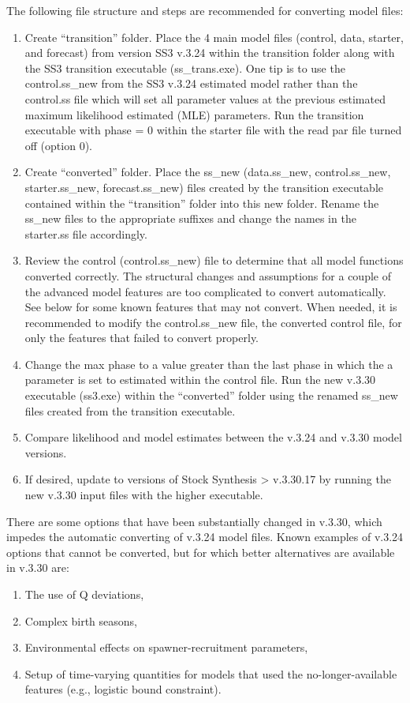 The following file structure and steps are recommended for converting model files:
\begin{enumerate}
	\item Create ``transition'' folder.  Place the 4 main model files (control, data, starter, and forecast) from version SS3 v.3.24 within the transition folder along with the SS3 transition executable (ss\_trans.exe).  One tip is to use the control.ss\_new from the SS3 v.3.24 estimated model rather than the control.ss file which will set all parameter values at the previous estimated maximum likelihood estimated (MLE) parameters.  Run the transition executable with phase = 0 within the starter file with the read par file turned off (option 0).
	
	\item Create ``converted'' folder.  Place the ss\_new (data.ss\_new, control.ss\_new, starter.ss\_new, forecast.ss\_new) files created by the transition executable contained within the ``transition'' folder into this new folder.  Rename the ss\_new files to the appropriate suffixes and change the names in the starter.ss file accordingly.
	
	\item Review the control (control.ss\_new) file to determine that all model functions converted correctly.  The structural changes and assumptions for a couple of the advanced model features are too complicated to convert automatically.  See below for some known features that may not convert. When needed, it is recommended to modify the control.ss\_new file, the converted control file, for only the features that failed to convert properly.
	
	\item Change the max phase to a value greater than the last phase in which the a parameter is set to estimated within the control file.  Run the new v.3.30 executable (ss3.exe) within the ``converted'' folder using the renamed ss\_new files created from the transition executable.
	
	\item Compare likelihood and model estimates between the v.3.24 and v.3.30 model versions.
	
	\item If desired, update to versions of Stock Synthesis > v.3.30.17 by running the new v.3.30 input files with the higher executable.
\end{enumerate}

\noindent There are some options that have been substantially changed in v.3.30, which impedes the automatic converting of v.3.24 model files. Known examples of v.3.24 options that cannot be converted, but for which better alternatives are available in v.3.30 are:
\begin{enumerate}
	\item The use of Q deviations,
	\item Complex birth seasons,
	\item Environmental effects on spawner-recruitment parameters,
	\item Setup of time-varying quantities for models that used the no-longer-available features (e.g., logistic bound constraint).\end{enumerate}

\pagebreak
